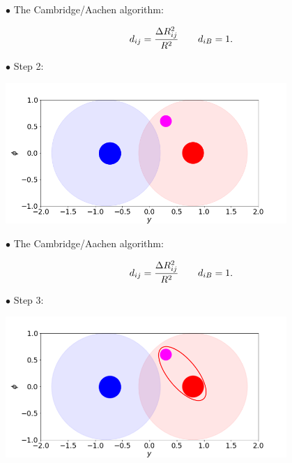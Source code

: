 \documentclass[9pt,a4paper,unknownkeysallowed,xcolor=dvipsnames,aspectratio=43]{beamer}
\begin{document}
%
%
\begin{frame}

{\color{darkred}\Large$\bullet$} {\color{darkred} The Cambridge/Aachen algorithm:}

  \begin{equation}
    d_{ij} = \frac{\Delta R_{ij}^2}{R^2}\qquad d_{iB} = 1.\notag
  \end{equation}
 \vspace{2mm}
  
{\color{darkred}\Large$\bullet$} Step 2:
\vspace{2mm}
\begin{center}
\includegraphics[width=0.8\textwidth]{ca2.png}
\end{center}
\end{frame}
%
%
\begin{frame}

{\color{darkred}\Large$\bullet$} {\color{darkred} The Cambridge/Aachen algorithm:}

  \begin{equation}
    d_{ij} = \frac{\Delta R_{ij}^2}{R^2}\qquad d_{iB} = 1.\notag
  \end{equation}
 \vspace{2mm}
  
{\color{darkred}\Large$\bullet$} Step 3:
\vspace{2mm}
\begin{center}
\includegraphics[width=0.8\textwidth]{ca23.png}
\end{center}
\end{frame}
\end{document}
